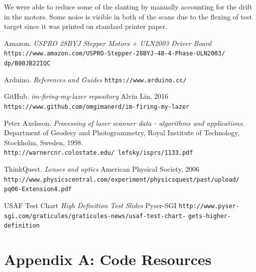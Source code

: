 \documentclass[letterpaper, 12pt]{article}
\begin{document}
\par
We were able to reduce some of the slanting by manually accounting for the drift in the motors. Some noise is visible in both of the scans due to the flexing of test target since it was printed on standard printer paper.

\newpage

\begin{thebibliography}{9}

  Amazon.
  \textit{USPRO 28BYJ Stepper Motors + ULN2003 Driver Board}
  \texttt{https://www.amazon.com/USPRO-Stepper-28BYJ-48-4-Phase-ULN2003/}
  \texttt{dp/B00JB22IQC}

  Arduino.
  \textit{References and Guides}\newline
  \texttt{https://www.arduino.cc/}

  GitHub.
  \textit{im-firing-my-lazer repository}
  Alvin Lin, 2016\newline
  \texttt{https://www.github.com/omgimanerd/im-firing-my-lazer}

  Peter Axelsson.
  \textit{Processing of laser scanner data - algorithms and applications}.
  Department of Geodesy and Photogrammetry, Royal Institute of Technology, Stockholm, Sweden, 1998.\newline
  \texttt{http://warnercnr.colostate.edu/~lefsky/isprs/1133.pdf}

  ThinkQuest.
  \textit{Lenses and optics}
  American Physical Society, 2006\newline
  \texttt{http://www.physicscentral.com/experiment/physicsquest/past/upload/}
  \texttt{pq06-Extension4.pdf}

  USAF Test Chart
  \textit{High Definition Test Slides}
  Pyser-SGI\newline
  \texttt{http://www.pyser-sgi.com/graticules/graticules-news/usaf-test-chart-}
  \texttt{gets-higher-definition}

\end{thebibliography}

\newpage

\appendix
\section{Appendix A: Code Resources}
\end{document}
